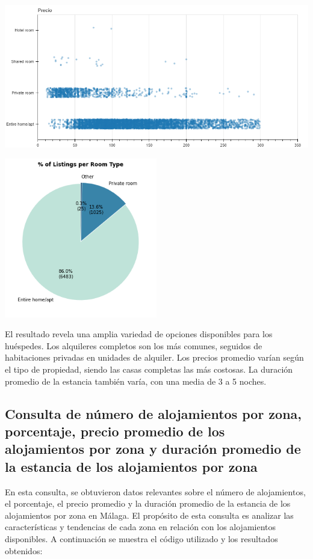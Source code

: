 \begin{center}
    \centering
    \includegraphics[width=1\textwidth]{capturas/5.png}
\end{center}
\begin{center}
    \centering
    \includegraphics[width=0.5\textwidth]{capturas/14.png}
\end{center}
El resultado revela una amplia variedad de opciones disponibles para los huéspedes. Los alquileres completos son los más comunes, seguidos de habitaciones privadas en unidades de alquiler. Los precios promedio varían según el tipo de propiedad, siendo las casas completas las más costosas. La duración promedio de la estancia también varía, con una media de 3 a 5 noches.

\subsection{Consulta de número de alojamientos por zona, porcentaje, precio promedio de los alojamientos por zona y duración promedio de la estancia de los alojamientos por zona}

En esta consulta, se obtuvieron datos relevantes sobre el número de alojamientos, el porcentaje, el precio promedio y la duración promedio de la estancia de los alojamientos por zona en Málaga. El propósito de esta consulta es analizar las características y tendencias de cada zona en relación con los alojamientos disponibles. A continuación se muestra el código utilizado y los resultados obtenidos:

